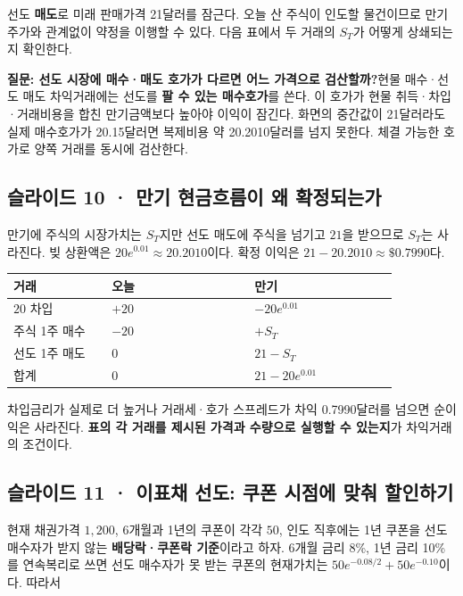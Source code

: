 \documentclass[11pt,a4paper]{article}
\begin{document}
선도 \textbf{매도}로 미래 판매가격 21달러를 잠근다. 오늘 산 주식이 인도할 물건이므로 만기 주가와 관계없이 약정을 이행할 수 있다. 다음 표에서 두 거래의 $S_T$가 어떻게 상쇄되는지 확인한다.\par

\par\medskip\noindent\textbf{질문: 선도 시장에 매수·매도 호가가 다르면 어느 가격으로 검산할까?}\quad 현물 매수·선도 매도 차익거래에는 선도를 \textbf{팔 수 있는 매수호가}를 쓴다. 이 호가가 현물 취득·차입·거래비용을 합친 만기금액보다 높아야 이익이 잠긴다. 화면의 중간값이 21달러라도 실제 매수호가가 20.15달러면 복제비용 약 20.2010달러를 넘지 못한다. 체결 가능한 호가로 양쪽 거래를 동시에 검산한다.\par

\subsection{슬라이드 10 · 만기 현금흐름이 왜 확정되는가}
만기에 주식의 시장가치는 $S_T$지만 선도 매도에 주식을 넘기고 $21$을 받으므로 $S_T$는 사라진다. 빚 상환액은 $20e^{0.01}\approx20.2010$이다. 확정 이익은 $21-20.2010\approx\$0.7990$다.\par

\begin{center}\small\begin{tabular}{p{0.22\linewidth}p{0.32\linewidth}p{0.32\linewidth}}\hline
거래 & 오늘 & 만기 \\ \hline
$20$ 차입 & $+20$ & $-20e^{0.01}$ \\
주식 1주 매수 & $-20$ & $+S_T$ \\
선도 1주 매도 & $0$ & $21-S_T$ \\
합계 & $0$ & $21-20e^{0.01}$ \\
\hline\end{tabular}\end{center}\normalsize

차입금리가 실제로 더 높거나 거래세·호가 스프레드가 차익 0.7990달러를 넘으면 순이익은 사라진다. \textbf{표의 각 거래를 제시된 가격과 수량으로 실행할 수 있는지}가 차익거래의 조건이다.\par

\subsection{슬라이드 11 · 이표채 선도: 쿠폰 시점에 맞춰 할인하기}
현재 채권가격 $1,200$, 6개월과 1년의 쿠폰이 각각 $50$, 인도 직후에는 1년 쿠폰을 선도 매수자가 받지 않는 \textbf{배당락·쿠폰락 기준}이라고 하자. 6개월 금리 8\%, 1년 금리 10\%를 연속복리로 쓰면 선도 매수자가 못 받는 쿠폰의 현재가치는 $50e^{-0.08/2}+50e^{-0.10}$이다. 따라서\par
\end{document}
